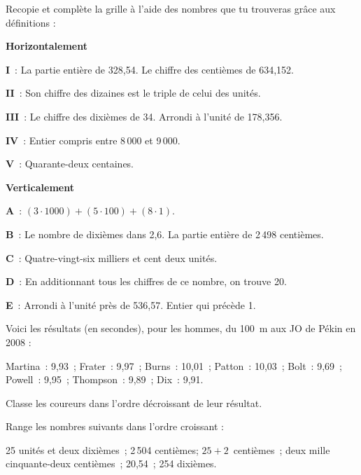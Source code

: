 \begin{exercice}
Recopie et complète la grille à l'aide des nombres que tu trouveras grâce aux définitions :
\vspace{0.75em}

\textbf{Horizontalement}

\textbf{I} : La partie entière de 328,54. Le chiffre des centièmes de 634,152.

\textbf{II} : Son chiffre des dizaines est le triple de celui des unités.

\textbf{III} : Le chiffre des dixièmes de 34. Arrondi à l'unité de 178,356.

\textbf{IV} : Entier compris entre 8\,000 et 9\,000.

\textbf{V} : Quarante-deux centaines.

\vspace{0.75em}

\textbf{Verticalement}

\textbf{A} : $(3 \cdot 1 000) + (5 \cdot 100) + (8 \cdot 1)$.

\textbf{B} : Le nombre de dixièmes dans 2,6. La partie entière de 2\,498 centièmes.

\textbf{C} : Quatre-vingt-six milliers et cent deux unités.

\textbf{D} : En additionnant tous les chiffres de ce nombre, on trouve 20.

\textbf{E} : Arrondi à l'unité près de 536,57. Entier qui précède 1.

\end{exercice}


\begin{exercice}
Voici les résultats (en secondes), pour les hommes, du 100 m aux JO de Pékin en 2008 : \vspace{0.75em}

Martina : 9,93 ; Frater : 9,97 ; Burns : 10,01 ; Patton : 10,03 ; Bolt : 9,69 ; Powell : 9,95 ; Thompson : 9,89 ; Dix : 9,91.\vspace{0.75em}

Classe les coureurs dans l'ordre décroissant de leur résultat.
\end{exercice}


\begin{exercice}[À ordonner]
Range les nombres suivants dans l'ordre croissant : \vspace{0.75em}

25 unités et deux dixièmes ; 2\,504 centièmes; $25 + 2$ centièmes ; deux mille cinquante‑deux centièmes ; 20,54 ; 254 dixièmes.
\end{exercice}


